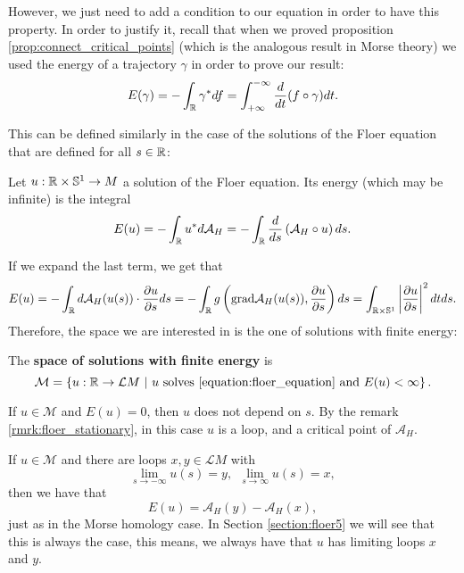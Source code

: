 However, we just need to add a condition to our equation in order to have this property. In order to justify it, recall that when we proved proposition \ref{prop:connect_critical_points} (which is the analogous result in Morse theory) we used the energy of a trajectory $\gamma$ in order to prove our result:
\[E(\gamma) = - \int_{\mathbb{R}} \gamma^{\ast} d f = \int_{+\infty}^{-\infty} \frac{d}{d t} (f \circ \gamma) d t .\]

This can be defined similarly in the case of the solutions of the Floer equation that are defined for all $s \in \mathbb{R}$:

\begin{deff} \label{definition:floer_energy}
Let $u : \mathbb{R} \times \mathbb{S}^1 \rightarrow M$ a solution of the Floer equation. Its energy (which may be infinite) is the integral
\[E(u) = - \int_{\mathbb{R}} u^{\ast} d \mathcal{A}_H = - \int_{\mathbb{R}} \frac{d}{d s} \left( \mathcal{A}_H \circ u \right) d s .\]
\end{deff}

If we expand the last term, we get that
\[E(u) = - \int_{\mathbb{R}} d \mathcal{A}_H(u(s)) \cdot \frac{\partial u}{\partial s} d s = - \int_{\mathbb{R}} g \left(\mathrm{grad}\mathcal{A}_H(u(s)),\frac{\partial u}{\partial s} \right) d s = \int_{\mathbb{R} \times \mathbb{S}^1} \left| \frac{\partial u}{\partial s} \right|^2 d t d s .\]
Therefore, the space we are interested in is the one of solutions with finite energy:

\begin{deff} \label{definition:finite_energy_space}
The {\bf space of solutions with finite energy} is
\[\mathcal{M} = \left\{ u : \mathbb{R} \rightarrow \mathcal{L}M \ | \ u \text{ solves \ref{equation:floer_equation} and } E(u) < \infty \right\} .\]
\end{deff}

\begin{rmrk} \label{remark:floer_energy_zero}
If $u \in \mathcal{M}$ and $E(u) = 0$, then $u$ does not depend on $s$. By the remark \ref{rmrk:floer_stationary}, in this case $u$ is a loop, and a critical point of $\mathcal{A}_H$.
\end{rmrk}

\begin{rmrk} \label{remark:floer_limits}
If $u \in \mathcal{M}$ and there are loops $x,y \in \mathcal{L}M$ with
\[\lim_{s \rightarrow -\infty} u(s) = y, \ \ \lim_{s \rightarrow \infty} u(s) = x ,\]
then we have that
\[E(u) = \mathcal{A}_H(y) - \mathcal{A}_H(x) ,\]
just as in the Morse homology case.
In Section \ref{section:floer5} we will see that this is always the case, this means, we always have that $u$ has limiting loops $x$ and $y$.
\end{rmrk}
